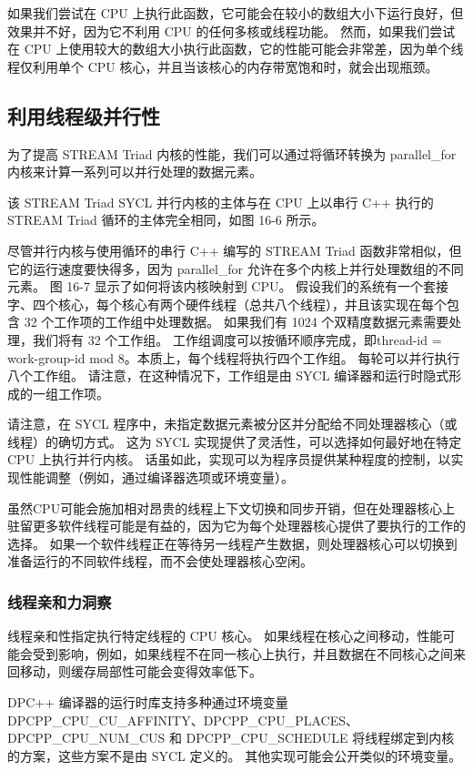 如果我们尝试在 CPU 上执行此函数，它可能会在较小的数组大小下运行良好，但效果并不好，因为它不利用 CPU 的任何多核或线程功能。 然而，如果我们尝试在 CPU 上使用较大的数组大小执行此函数，它的性能可能会非常差，因为单个线程仅利用单个 CPU 核心，并且当该核心的内存带宽饱和时，就会出现瓶颈。

\subsection{利用线程级并行性}
为了提高 STREAM Triad 内核的性能，我们可以通过将循环转换为 parallel\_for 内核来计算一系列可以并行处理的数据元素。

该 STREAM Triad SYCL 并行内核的主体与在 CPU 上以串行 C++ 执行的 STREAM Triad 循环的主体完全相同，如图 16-6 所示。

尽管并行内核与使用循环的串行 C++ 编写的 STREAM Triad 函数非常相似，但它的运行速度要快得多，因为 parallel\_for 允许在多个内核上并行处理数组的不同元素。 图 16-7 显示了如何将该内核映射到 CPU。 假设我们的系统有一个套接字、四个核心，每个核心有两个硬件线程（总共八个线程），并且该实现在每个包含 32 个工作项的工作组中处理数据。 如果我们有 1024 个双精度数据元素需要处理，我们将有 32 个工作组。 工作组调度可以按循环顺序完成，即thread-id = work-group-id mod 8。本质上，每个线程将执行四个工作组。 每轮可以并行执行八个工作组。 请注意，在这种情况下，工作组是由 SYCL 编译器和运行时隐式形成的一组工作项。

请注意，在 SYCL 程序中，未指定数据元素被分区并分配给不同处理器核心（或线程）的确切方式。 这为 SYCL 实现提供了灵活性，可以选择如何最好地在特定 CPU 上执行并行内核。 话虽如此，实现可以为程序员提供某种程度的控制，以实现性能调整（例如，通过编译器选项或环境变量）。

虽然CPU可能会施加相对昂贵的线程上下文切换和同步开销，但在处理器核心上驻留更多软件线程可能是有益的，因为它为每个处理器核心提供了要执行的工作的选择。 如果一个软件线程正在等待另一线程产生数据，则处理器核心可以切换到准备运行的不同软件线程，而不会使处理器核心空闲。

\subsubsection{线程亲和力洞察}
线程亲和性指定执行特定线程的 CPU 核心。 如果线程在核心之间移动，性能可能会受到影响，例如，如果线程不在同一核心上执行，并且数据在不同核心之间来回移动，则缓存局部性可能会变得效率低下。

DPC++ 编译器的运行时库支持多种通过环境变量 DPCPP\_CPU\_CU\_AFFINITY、DPCPP\_CPU\_PLACES、DPCPP\_CPU\_NUM\_CUS 和 DPCPP\_CPU\_SCHEDULE 将线程绑定到内核的方案，这些方案不是由 SYCL 定义的。 其他实现可能会公开类似的环境变量。

